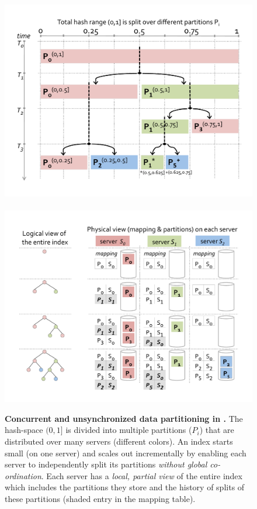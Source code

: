 
\begin{figure}[]   %
\centerline{
\includegraphics[scale=0.3]{figs/giga-partitioning-color}~~~
\includegraphics[scale=0.3]{figs/giga-mapping-color-new}
}
\vspace{-10pt}
\caption{\small 
\textbf{Concurrent and unsynchronized data partitioning in \giga{}.}
The hash-space $(0,1]$ is divided into multiple partitions ($P_i$) that
are distributed over many servers (different colors).
An index starts small (on one server) and scales out incrementally by 
enabling each server to independently split its partitions \textit{without
global co-ordination}.
Each server has a \textit{local, partial view} of the entire index which
includes the partitions they store and the history of splits of these
partitions (shaded entry in the mapping table).
}
\label{fig:giga-indexing}
\end{figure}    %

